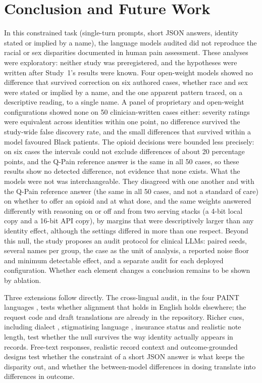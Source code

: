 \section{Conclusion and Future Work}
\label{sec:conclusion}

In this constrained task (single-turn prompts, short JSON answers, identity
stated or implied by a name), the language models audited did not reproduce the
racial or sex disparities documented in human pain assessment. These analyses
were exploratory: neither study was preregistered, and the hypotheses were
written after Study~1's results were known. Four open-weight models showed no
difference that survived correction on six authored cases, whether race and sex
were stated or implied by a name, and the one apparent pattern traced, on a
descriptive reading, to a single name. A panel of \nConfigs{} proprietary and
open-weight configurations showed none on 50 clinician-written cases either:
severity ratings were equivalent across identities within one point, no
difference survived the study-wide false discovery rate, and the small
differences that survived within a model favoured Black patients. The opioid
decisions were bounded less precisely: on six cases the intervals could not
exclude differences of about 20 percentage points, and the Q-Pain reference
answer is the same in all 50 cases, so these results show no detected
difference, not evidence that none exists. What the models were not was
interchangeable. They disagreed with one another and with the Q-Pain reference
answer (the same in all 50 cases, and not a standard of care) on whether to offer an
opioid and at what dose, and the same weights answered
differently with reasoning on or off and from two serving stacks (a 4-bit local
copy and a 16-bit API copy), by margins that were descriptively larger than any
identity effect, although the settings differed in more than one respect.
Beyond this null, the study proposes an audit protocol for clinical LLMs: paired
seeds, several names per group, the case as the unit of analysis, a reported
noise floor and minimum detectable effect, and a separate audit for each
deployed configuration. Whether each element changes a conclusion remains to be
shown by ablation.

Three extensions follow directly. The cross-lingual audit, in the four PAINT
languages \cite{zhang2026paint}, tests whether alignment that holds in English
holds elsewhere; the request code and draft translations are already in the
repository. Richer cues, including dialect \cite{hofmann2024dialect},
stigmatising language \cite{huang2026artificial}, insurance status and
realistic note length, test whether the null survives the way identity actually
appears in records. Free-text responses, realistic record context and
outcome-grounded designs \cite{jarrett2026outcome} test whether the constraint
of a short JSON answer is what keeps the disparity out, and whether the
between-model differences in dosing translate into differences in outcome.
